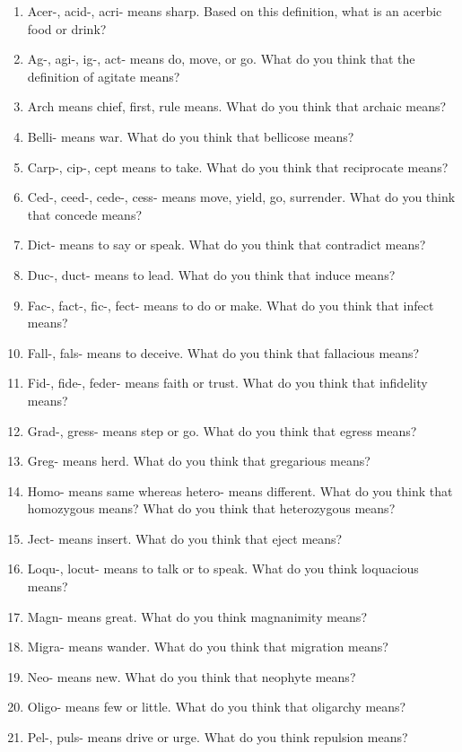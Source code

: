\begin{spacing}{2}
\begin{enumerate}
\item Acer-, acid-, acri- means sharp. Based on this definition, what is an acerbic food or drink?
\item Ag-, agi-, ig-, act- means do, move, or go. What do you think that the definition of agitate means?
\item Arch means chief, first, rule means. What do you think that archaic means?
\item Belli- means war. What do you think that bellicose means?
\item Carp-, cip-, cept means to take. What do you think that reciprocate means?
\item Ced-, ceed-, cede-, cess- means move, yield, go, surrender. What do you think that concede means?
\item Dict- means to say or speak. What do you think that contradict means?
\item Duc-, duct- means to lead. What do you think that induce means?
\item Fac-, fact-, fic-, fect- means to do or make. What do you think that infect means? 
\item Fall-, fals- means to deceive. What do you think that fallacious means?
\item Fid-, fide-, feder- means faith or trust. What do you think that infidelity means?
\item Grad-, gress- means step or go. What do you think that egress means?
\item Greg- means herd. What do you think that gregarious means?
\item Homo- means same whereas hetero- means different. What do you think that homozygous means? What do you think that heterozygous means?
\item Ject- means insert. What do you think that eject means?
\item Loqu-, locut- means to talk or to speak. What do you think loquacious means?
\item Magn- means great. What do you think magnanimity means?
\item Migra- means wander. What do you think that migration means?
\item Neo- means new. What do you think that neophyte means?
\item Oligo- means few or little. What do you think that oligarchy means?
\item Pel-, puls- means drive or urge. What do you think repulsion means?

\end{enumerate}
\end{spacing}
